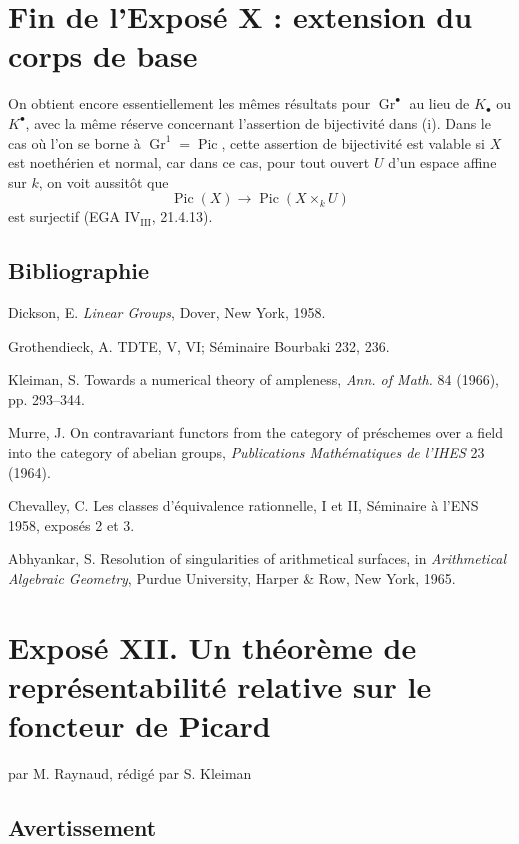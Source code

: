 \documentclass[11pt]{article}
\newcommand{\Gr}{\operatorname{Gr}}
\providecommand{\Pic}{\operatorname{Pic}}
\providecommand{\Gr}{\operatorname{Gr}}
\providecommand{\Gr}{\operatorname{G}}
\begin{document}
\section*{Fin de l'Exposé X : extension du corps de base}

On obtient encore essentiellement les mêmes résultats pour \(\Gr^\bullet\) au lieu de \(K_\bullet\) ou \(K^\bullet\), avec la même réserve concernant l'assertion de bijectivité dans (i). Dans le cas où l'on se borne à \(\Gr^1=\Pic\), cette assertion de bijectivité est valable si \(X\) est noethérien et normal, car dans ce cas, pour tout ouvert \(U\) d'un espace affine sur \(k\), on voit aussitôt que
\[
  \Pic(X)\longrightarrow \Pic(X\times_k U)
\]
est surjectif (EGA \(\mathrm{IV}_{\mathrm{III}}\), 21.4.13).

\subsection*{Bibliographie}
\begin{enumerate}[label={[\arabic*]}]
\item Dickson, E. \emph{Linear Groups}, Dover, New York, 1958.
\item Grothendieck, A. TDTE, V, VI; Séminaire Bourbaki 232, 236.
\item Kleiman, S. Towards a numerical theory of ampleness, \emph{Ann. of Math.} 84 (1966), pp. 293--344.
\item Murre, J. On contravariant functors from the category of préschemes over a field into the category of abelian groups, \emph{Publications Mathématiques de l'IHES} 23 (1964).
\item Chevalley, C. Les classes d'équivalence rationnelle, I et II, Séminaire à l'ENS 1958, exposés 2 et 3.
\item Abhyankar, S. Resolution of singularities of arithmetical surfaces, in \emph{Arithmetical Algebraic Geometry}, Purdue University, Harper \& Row, New York, 1965.
\end{enumerate}

\newpage
\section*{Exposé XII. Un théorème de représentabilité relative sur le foncteur de Picard}
\begin{center}
par M. Raynaud, rédigé par S. Kleiman
\end{center}

\subsection*{Avertissement}
\end{document}
